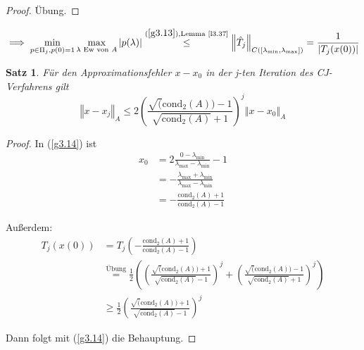 \documentclass{book}
\newtheorem{theorem}[algorithm]{Satz}
\def\cond{\text{cond}}
\begin{document}
            \begin{proof}
                Übung.
            \end{proof}

            \begin{equation}\label{g3.14}  
                \implies \min_{p\in\Pi_j,p(0)=1}\max_{\lambda \text{ Ew von }A} |p(\lambda)| \stackrel{(\ref{g3.13}), \text{Lemma \ref{l3.37}}}{\leq} \left\Vert \hat{T}_j \right\Vert_{C([\lambda_{\min},\lambda_{\max}])}=\frac{1}{\left\vert T_j(x(0)) \right\vert}
            \end{equation}

            \begin{theorem}\label{s3.38}
                Für den Approximationsfehler $x-x_0$ in der j-ten Iteration des CJ-Verfahrens gilt
                \begin{equation*}
                    \left\Vert x-x_j \right\Vert_A\leq 2\left(\frac{\sqrt(\cond_2(A))-1}{\sqrt{\cond_2(A)}+1}\right)^j\left\Vert x-x_0 \right\Vert_A
                \end{equation*}
            \end{theorem}

            \begin{proof}
                In (\ref{g3.14}) ist 
                \begin{align*}
                    x_0&=2\frac{0-\lambda_{\min}}{\lambda_{\max}-\lambda_{\min}}-1\\
                    &=-\frac{\lambda_{\max}+\lambda_{\min}}{\lambda_{\max}-\lambda_{\min}}\\
                    &=-\frac{\cond_2(A)+1}{\cond_2(A)-1}
                \end{align*}

                Außerdem: 
                \begin{align*}
                    T_j(x(0))&=T_j\left(-\frac{\cond_2(A)+1}{\cond_2(A)-1}\right)\\
                    &\stackrel{\text{Übung}}{=}\frac{1}{2}\left(\left(\frac{\sqrt(\cond_2(A))+1}{\sqrt{\cond_2(A)}-1}\right)^j+\left(\frac{\sqrt(\cond_2(A))-1}{\sqrt{\cond_2(A)}+1}\right)^j\right)\\
                    &\geq \frac{1}{2}\left(\frac{\sqrt(\cond_2(A))+1}{\sqrt{\cond_2(A)}-1}\right)^j
                \end{align*}

                Dann folgt mit (\ref{g3.14}) die Behauptung.

            \end{proof}
\end{document}

